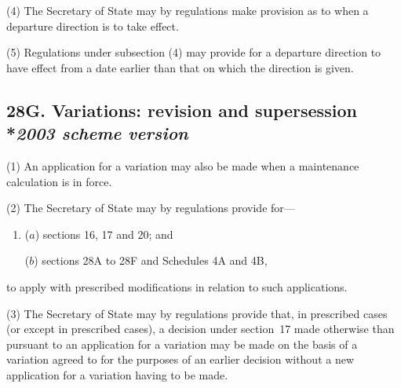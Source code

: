 \documentclass[12pt,a4paper]{article}
\begin{document}
(4) The Secretary of State may by regulations make provision as to when a departure direction is to take effect.

(5) Regulations under subsection (4) may provide for a departure direction to have effect from a date earlier than that on which the direction is given.


\subsection[28G. Variations: revision and supersession --- \emph{2003 scheme version}]{28G. Variations: revision and supersession\\*\emph{2003 scheme version}}

(1) An application for a variation may also be made when a maintenance calculation is in force.

(2) The Secretary of State may by regulations provide for—
\begin{enumerate}\item[]
($a$) sections 16, 17 and 20; and

($b$) sections 28A to 28F and Schedules 4A and 4B,
\end{enumerate}
to apply with prescribed modifications in relation to such applications.

(3) The Secretary of State may by regulations provide that, in prescribed cases (or except in prescribed cases), a decision under section~17 made otherwise than pursuant to an application for a variation may be made on the basis of a variation agreed to for the purposes of an earlier decision without a new application for a variation having to be made.

\end{document}
